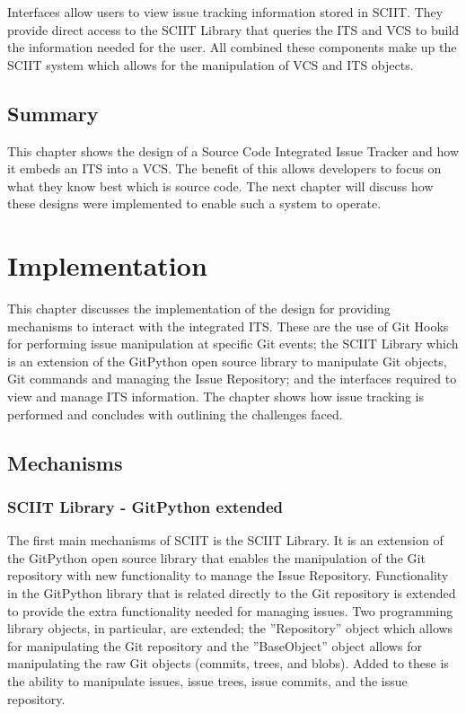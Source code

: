 \documentclass{mproj}
\begin{document}
Interfaces allow users to view issue tracking information stored in SCIIT. They provide direct access to the SCIIT Library that queries the ITS and VCS to build the information needed for the user. All combined these components make up the SCIIT system which allows for the manipulation of VCS and ITS objects.


\section{Summary}

This chapter shows the design of a Source Code Integrated Issue Tracker and how it embeds an ITS into a VCS. The benefit of this allows developers to focus on what they know best which is source code. The next chapter will discuss how these designs were implemented to enable such a system to operate.


\chapter{Implementation}\label{implementation}

This chapter discusses the implementation of the design for providing mechanisms to interact with the integrated ITS. These are the use of Git Hooks for performing issue manipulation at specific Git events; the SCIIT Library which is an extension of the GitPython open source library to manipulate Git objects, Git commands and managing the Issue Repository; and the interfaces required to view and manage ITS information. The chapter shows how issue tracking is performed and concludes with outlining the challenges faced.


\section{Mechanisms}

\subsection{SCIIT Library - GitPython extended}

The first main mechanisms of SCIIT is the SCIIT Library. It is an extension of the GitPython open source library that enables the manipulation of the Git repository with new functionality to manage the Issue Repository. Functionality in the GitPython library that is related directly to the Git repository is extended to provide the extra functionality needed for managing issues. Two programming library objects, in particular, are extended; the ”Repository” object which allows for manipulating the Git repository and the ”BaseObject” object allows for manipulating the raw Git objects (commits, trees, and blobs). Added to these is the ability to manipulate issues, issue trees, issue commits, and the issue repository.
\end{document}
